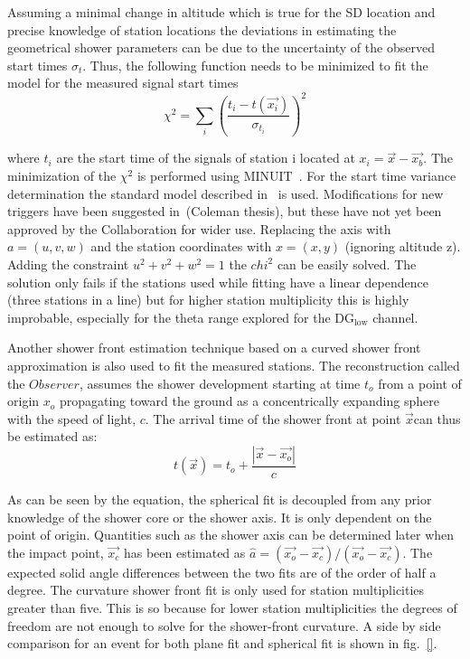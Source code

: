 Assuming a minimal change in altitude which is true for the SD location and precise knowledge of station locations the deviations in estimating the geometrical shower parameters can be due to the uncertainty of the observed start times $\sigma_t$. Thus, the following function needs to be minimized to fit the model for the measured signal start times 
\begin{equation}
  \chi^2 = \sum_{i} \left(\frac{t_i - t(\vec{x_i})}{\sigma_{t_{i}}}\right)^2
\end{equation}

where $t_i$ are the start time of the signals of station i located at $x_i = \vec{x} - \vec{x_b}$. The minimization of the $\chi^2$ is performed using MINUIT~\cite{James:1975dr}. For the start time variance determination the standard model described in~\cite{PierreAuger:2020yab} is used. Modifications for new triggers have been suggested in~\cite{}(Coleman thesis), but these have not yet been approved by the Collaboration for wider use. Replacing the axis with $a =(u,v,w)$ and the station coordinates with $x = (x,y)$ (ignoring altitude z). Adding the constraint $u^2 + v^2 + w^2 = 1$ the $chi^2$ can be easily solved. The solution only fails if the stations used while fitting have a linear dependence (three stations in a line) but for higher station multiplicity this is highly improbable, especially for the theta range explored for the DG$\mathrm{_{low}}$ channel.
 
Another shower front estimation technique based on a curved shower front approximation is also used to fit the measured stations. The reconstruction called the $Observer$, assumes the shower development starting at time $t_o$ from a point of origin $x_o$ propagating toward the ground as a concentrically expanding sphere with the speed of light, $c$. The arrival time of the shower front at point $\vec{x}$can thus be estimated as:
\begin{equation}
  t(\vec{x}) = t_o + \frac{|\vec{x}-\vec{x_o}|}{c}
\end{equation}

As can be seen by the equation, the spherical fit is decoupled from any prior knowledge of the shower core or the shower axis. It is only dependent on the point of origin. Quantities such as the shower axis can be determined later when the impact point, $\vec{x_c}$ has been estimated as $ \hat{a} = (\vec{x_o} -\vec{x_c})/ (\vec{x_o}-\vec{x_c})$. The expected solid angle differences between the two fits are of the order of half a degree. The curvature shower front fit is only used for station multiplicities greater than five. This is so because for lower station multiplicities the degrees of freedom are not enough to solve for the shower-front curvature. A side by side comparison for an event for both plane fit and spherical fit is shown in fig.~\ref{}.

